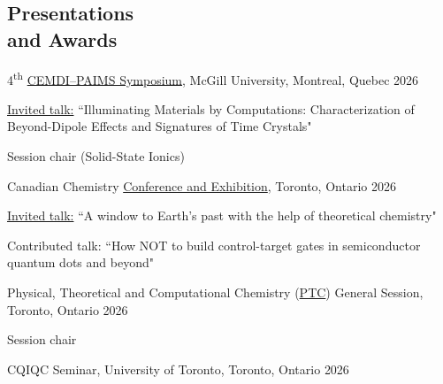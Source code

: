 \documentclass[margin,line]{res}
\newenvironment{list1}{
  \begin{list}{\ding{113}}{%
      \setlength{\itemsep}{0in}
      \setlength{\parsep}{0in} \setlength{\parskip}{0in}
      \setlength{\topsep}{0in} \setlength{\partopsep}{0in} 
      \setlength{\leftmargin}{0.17in}}}{\end{list}}
\begin{document}
\newpage

\pagestyle{headings}


\begin{resume}

\section{\sc Presentations \\and Awards}

4\textsuperscript{th} \href{https://cemdi.ca/symposium.php?id=evt_4th_symposium_2026}{CEMDI--PAIMS Symposium}, McGill University, Montreal, Quebec \hfill{2026}

\begin{list1}
\item[]\underline{Invited talk:} ``Illuminating Materials by Computations: Characterization of Beyond-Dipole Effects and Signatures of Time Crystals"
\item[]Session chair (Solid-State Ionics)
\end{list1}

\vspace*{-1mm}

Canadian Chemistry \href{https://www.cheminst.ca/conference/x2026/}{Conference and Exhibition}, Toronto, Ontario \hfill{2026}

\begin{list1}
\item[]\underline{Invited talk:} ``A window to Earth's past with the help of theoretical chemistry"
\item[]Contributed talk: ``How NOT to build control-target gates in semiconductor quantum dots and beyond"
\end{list1}

\vspace*{-1mm}

Physical, Theoretical and Computational Chemistry (\href{https://www.cheminst.ca/physical-theoretical-and-computational-division-ptc/}{PTC}) General Session, Toronto, Ontario \hfill{2026}

\begin{list1}
\item[]Session chair
\end{list1}

\vspace*{-1mm}

CQIQC Seminar, University of Toronto, Toronto, Ontario \hfill{2026}


\end{resume}
\end{document}
